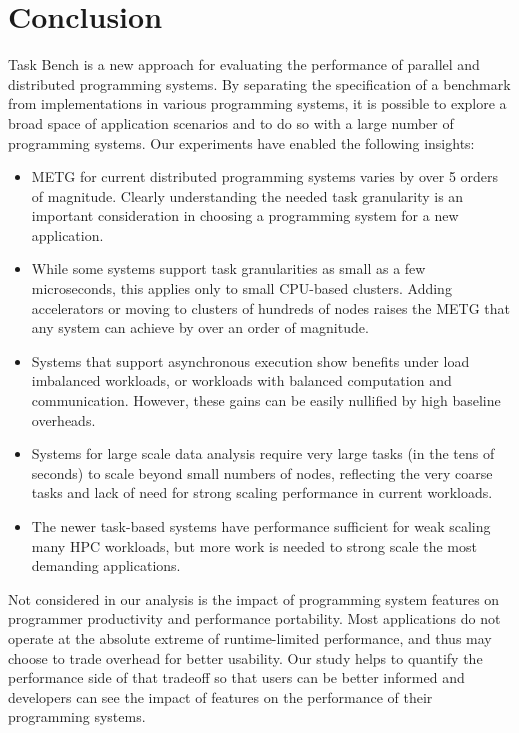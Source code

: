 \section{Conclusion}
\label{sec:conclusion}

Task Bench is a new approach for evaluating the performance of
parallel and distributed programming systems. By separating the
specification of a benchmark from implementations in various
programming systems, it is possible to explore a broad space of
application scenarios and to do so with a large number of programming
systems. Our experiments have enabled the following
insights:

\begin{itemize}

\item METG for current distributed programming systems varies by over
  5 orders of magnitude.  Clearly understanding the needed task
  granularity is an important consideration in choosing a programming
  system for a new application.

\item While some systems support task granularities as small as a few
  microseconds, this applies only to small CPU-based clusters. Adding
  accelerators or moving to clusters of hundreds of nodes raises the
  METG that any system can achieve by over an order of magnitude.

\item Systems that support asynchronous execution show benefits under
  load imbalanced workloads, or workloads with balanced computation
  and communication. However, these gains can be easily nullified by
  high baseline overheads.

\item Systems for large scale data analysis require very large tasks
  (in the tens of seconds) to scale beyond small numbers of nodes,
  reflecting the very coarse tasks and lack of need for strong scaling
  performance in current workloads.

\item The newer task-based systems have performance sufficient for
  weak scaling many HPC workloads, but more work is needed to strong
  scale the most demanding applications.

\end{itemize}

Not considered in our analysis is the impact of programming system
features on programmer productivity and performance portability. Most
applications do not operate at the absolute extreme of runtime-limited
performance, and thus may choose to trade overhead for better
usability. Our study helps to quantify the performance side of that
tradeoff so that users can be better informed and developers can see
the impact of features on the performance of their programming
systems.
